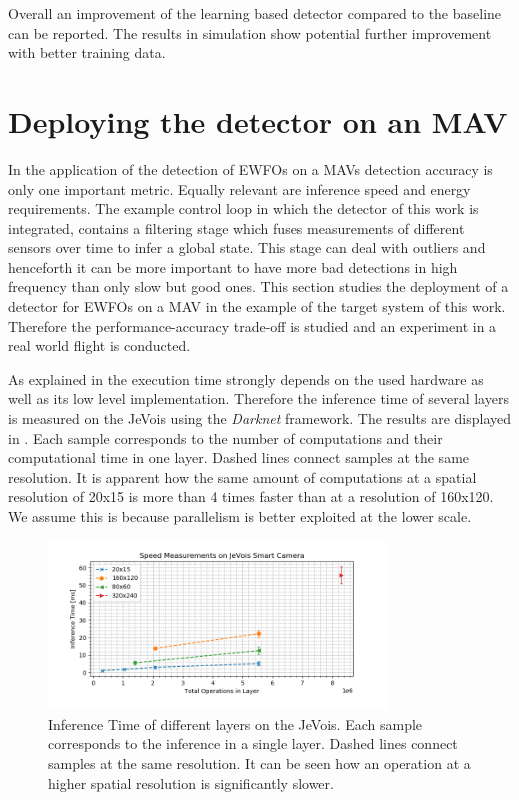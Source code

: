 Overall an improvement of the learning based detector compared to the baseline can be reported. The results in simulation show potential further improvement with better training data.


\section{Deploying the detector on an \ac{MAV}}

In the application of the detection of \acp{EWFO} on a \acp{MAV} detection accuracy is only one important metric. Equally relevant are inference speed and energy requirements. The example control loop in which the detector of this work is integrated, contains a filtering stage which fuses measurements of different sensors over time to infer a global state. This stage can deal with outliers and henceforth it can be more important to have more bad detections in high frequency than only slow but good ones. This section studies the deployment of a detector for \acp{EWFO} on a \ac{MAV} in the example of the target system of this work. Therefore the performance-accuracy trade-off is studied and an experiment in a real world flight is conducted.

As explained in  the execution time strongly depends on the used hardware as well as its low level implementation. Therefore the inference time of several layers is measured on the JeVois using the \textit{Darknet} framework. The results are displayed in . Each sample corresponds to the number of computations and their computational time in one layer. Dashed lines connect samples at the same resolution. It is apparent how the same amount of computations at a spatial resolution of 20x15 is more than 4 times faster than at a resolution of 160x120. We assume this is because parallelism is better exploited at the lower scale.

\begin{figure}[hbtp]
	\centering
	\includegraphics[width=0.8\textwidth]{fig/bottleneck_jevois}
	\caption{Inference Time of different layers on the JeVois. Each sample corresponds to the inference in a single layer. Dashed lines connect samples at the same resolution. It can be seen how an operation at a higher spatial resolution is significantly slower.}
	\label{fig:bottleneck_jevois}
\end{figure}

